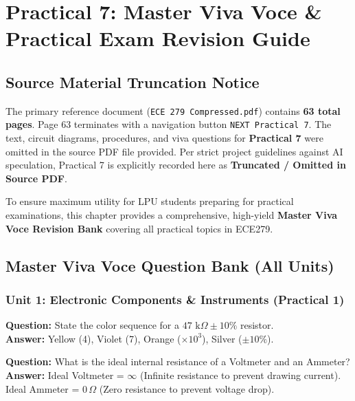 \chapter{Practical 7: Master Viva Voce \& Practical Exam Revision Guide}

\section{Source Material Truncation Notice}

\begin{commonmistake}
The primary reference document (\texttt{ECE 279 Compressed.pdf}) contains \textbf{63 total pages}. Page 63 terminates with a navigation button \texttt{NEXT Practical 7}. The text, circuit diagrams, procedures, and viva questions for \textbf{Practical 7} were omitted in the source PDF file provided. Per strict project guidelines against AI speculation, Practical 7 is explicitly recorded here as \textbf{Truncated / Omitted in Source PDF}.

To ensure maximum utility for LPU students preparing for practical examinations, this chapter provides a comprehensive, high-yield \textbf{Master Viva Voce Revision Bank} covering all practical topics in ECE279.
\end{commonmistake}

\section{Master Viva Voce Question Bank (All Units)}

\subsection{Unit 1: Electronic Components \& Instruments (Practical 1)}

\begin{vivaqa}
\textbf{Question:} State the color sequence for a $47\text{ k}\Omega \pm 10\%$ resistor.\\[4pt]
\textbf{Answer:} Yellow (4), Violet (7), Orange ($\times 10^3$), Silver ($\pm 10\%$).
\end{vivaqa}

\begin{vivaqa}
\textbf{Question:} What is the ideal internal resistance of a Voltmeter and an Ammeter?\\[4pt]
\textbf{Answer:} Ideal Voltmeter = $\infty$ (Infinite resistance to prevent drawing current). Ideal Ammeter = $0\,\Omega$ (Zero resistance to prevent voltage drop).
\end{vivaqa}


